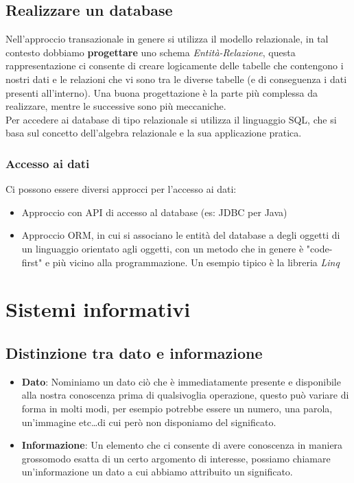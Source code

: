 \documentclass[a4paper,12pt]{report}
\begin{document}
\section{Realizzare un database}
Nell'approccio transazionale in genere si utilizza il modello relazionale, in tal contesto dobbiamo \textbf{progettare} uno schema \textit{Entità-Relazione}, questa rappresentazione ci consente di creare logicamente delle tabelle che contengono i nostri dati e le relazioni che vi sono tra le diverse tabelle (e di conseguenza i dati presenti all'interno). Una buona progettazione è la parte più complessa da realizzare, mentre le successive sono più meccaniche.\\
Per accedere ai database di tipo relazionale si utilizza il linguaggio SQL, che si basa sul concetto dell'algebra relazionale e la sua applicazione pratica.
\subsection{Accesso ai dati}
Ci possono essere diversi approcci per l'accesso ai dati:
\begin{itemize}
	\item Approccio con API di accesso al database (es: JDBC per Java)
	\item Approccio ORM, in cui si associano le entità del database a degli oggetti di un linguaggio orientato agli oggetti, con un metodo che in genere è "code-first" e più vicino alla programmazione. Un esempio tipico è la libreria \textit{Linq}
\end{itemize}
\chapter{Sistemi informativi}
\section{Distinzione tra dato e informazione}
\begin{itemize}
	\item \textbf{Dato}: Nominiamo un dato ciò che è immediatamente presente e disponibile alla nostra conoscenza prima di qualsivoglia operazione, questo può variare di forma in molti modi, per esempio potrebbe essere un numero, una parola, un'immagine etc\dots di cui però non disponiamo del significato.
	\item \textbf{Informazione}: Un elemento che ci consente di avere conoscenza in maniera grossomodo esatta di un certo argomento di interesse, possiamo chiamare un'informazione un dato a cui abbiamo attribuito un significato.
\end{itemize}
\end{document}
